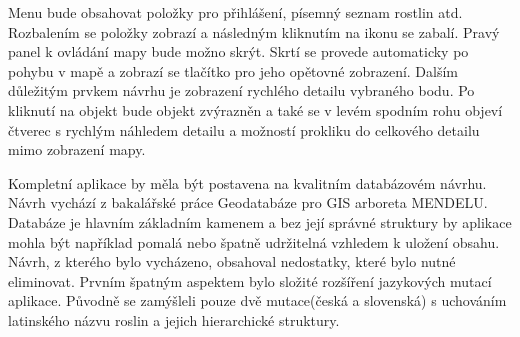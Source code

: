 \documentclass[12pt]{article}%
\begin{document}
{{Menu bude obsahovat položky pro přihlášení, písemný seznam rostlin atd. Rozbalením se položky 
zobrazí a následným kliknutím na ikonu se zabalí. Pravý panel k ovládání mapy bude možno skrýt. 
Skrtí se provede automaticky po pohybu v mapě a zobrazí se tlačítko pro jeho opětovné zobrazení. 
Dalším důležitým prvkem návrhu je zobrazení rychlého detailu vybraného bodu. Po kliknutí na objekt 
bude objekt zvýrazněn a také se v levém spodním rohu objeví čtverec s rychlým náhledem detailu 
a možností prokliku do celkového detailu mimo zobrazení mapy.

\obrazek
{}

\obrazek
{}



Kompletní aplikace by měla být postavena na kvalitním databázovém návrhu. Návrh vychází 
z bakalářské práce Geodatabáze pro GIS arboreta MENDELU. Databáze je hlavním základním 
kamenem a bez její správné struktury by aplikace mohla být například pomalá nebo špatně udržitelná 
vzhledem k uložení obsahu. Návrh, z kterého bylo vycházeno, obsahoval nedostatky, které bylo 
nutné eliminovat. Prvním špatným aspektem bylo složité rozšíření jazykových mutací aplikace. 
Původně se zamýšleli pouze dvě mutace(česká a slovenská) s uchováním latinského názvu roslin 
a jejich hierarchické struktury. 

}}
\end{document}
